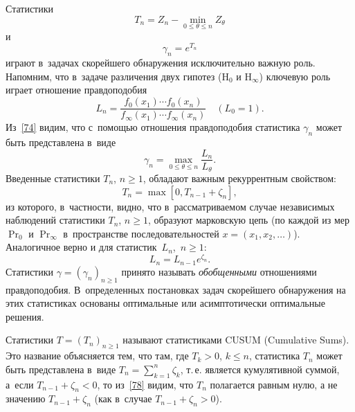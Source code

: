 Статистики
\begin{equation}
\label{75}%
    T_n=Z_n-\min_{0\le\theta\le n}Z_{\theta}
\end{equation}
и
\[
\gamma_n=e^{T_n}
\]
играют в~задачах скорейшего обнаружения исключительно важную роль.
Напомним, что в~задаче различения двух гипотез ($\mathrm{H}_0$ и
$\mathrm{H}_{\infty}$) ключевую роль играет отношение
правдоподобия
\begin{equation}
\label{76}%
L_n
    =\frac{f_0(x_1)\cdots f_0(x_n)}{f_{\infty}(x_1)\cdots f_{\infty}(x_n)}
    \quad
    (L_0=1).
\end{equation}
Из~\eqref{74} видим, что с~помощью отношения правдоподобия
статистика $\gamma_n$ может быть представлена в~виде
\begin{equation}
\label{77}%
    \gamma_n=\max_{0\le\theta\le n}\frac{L_n}{L_{\theta}}.
\end{equation}
Введенные статистики $T_n$, $n\ge1$, обладают важным рекуррентным
свойством:
\begin{equation}
\label{78}%
    T_n=\max\left[0,T_{n-1}+\zeta_n\right],
\end{equation}
из которого, в~частности, видно, что в~рассматриваемом случае
независимых наблюдений статистики $T_n$, $n\ge1$, образуют
марковскую цепь (по каждой из мер $\Pr_0$ и $\Pr_{\infty}$
в~пространстве последовательностей $x=(x_1,x_2,\ldots)$).
Аналогичное верно и для статистик~$L_n$,~$n\ge1$:
\begin{equation}
\label{79}%
    L_n=L_{n-1}e^{\zeta_n}.
\end{equation}
Статистики $\gamma=(\gamma_n)_{n\ge1}$ принято называть
\textit{обобщенными} отношениями правдоподобия. В~определенных
постановках задач скорейшего обнаружения на этих статистиках
основаны оптимальные или асимптотически оптимальные решения.

Статистики $T=(T_n)_{n\ge1}$ называют статистиками CUSUM
(Cumulative Sums). Это название объясняется тем, что там, где
$T_k>0$, $k\le n$, статистика $T_n$ может быть представлена в~виде
$T_n=\sum_{k=1}^n\zeta_k$, т.\,е. является кумулятивной суммой,
а~если $T_{n-1}+\zeta_n<0$, то из~\eqref{78} видим, что $T_n$
полагается равным нулю, а не значению $T_{n-1}+\zeta_n$ (как
в~случае $T_{n-1}+\zeta_n>0$).

